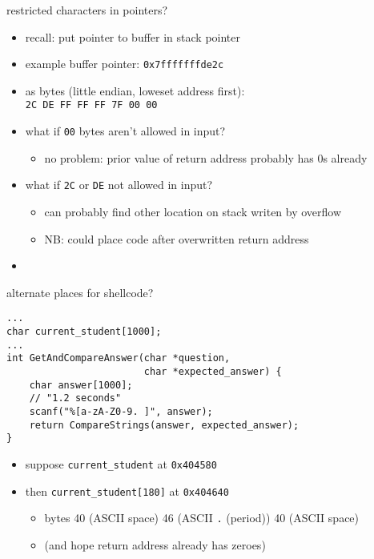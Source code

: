 \begin{frame}{restricted characters in pointers?}
    \begin{itemize}
    \item recall: put pointer to buffer in stack pointer
    \item example buffer pointer: \texttt{0x7fffffffde2c}
    \item as bytes (little endian, loweset address first): \\
         \texttt{2C DE FF FF FF 7F 00 00}
    \vspace{.5cm}
    \item what if \texttt{00} bytes aren't allowed in input?
        \begin{itemize}
        \item no problem: prior value of return address probably has 0s already
        \end{itemize}
    \item what if \texttt{2C} or \texttt{DE} not allowed in input?
        \begin{itemize}
        \item can probably find other location on stack writen by overflow
        \item NB: could place code after overwritten return address
        \end{itemize}
    \item {}
    \end{itemize}
\end{frame}

\begin{frame}[fragile,label=altShellcode]{alternate places for shellcode?}
\begin{lstlisting}
...
char current_student[1000];
...
int GetAndCompareAnswer(char *question,
                        char *expected_answer) {
    char answer[1000];
    // "1.2 seconds"
    scanf("%[a-zA-Z0-9. ]", answer);
    return CompareStrings(answer, expected_answer);
}
\end{lstlisting}
\begin{itemize}
\item suppose \texttt{current\_student} at \texttt{0x404580}
\item then \texttt{current\_student[180]} at \texttt{0x404640}
    \begin{itemize}
    \item bytes 40 (ASCII space) 46 (ASCII \texttt{.} (period)) 40 (ASCII space)
    \item (and hope return address already has zeroes)
    \end{itemize}
\end{itemize}
\end{frame}
